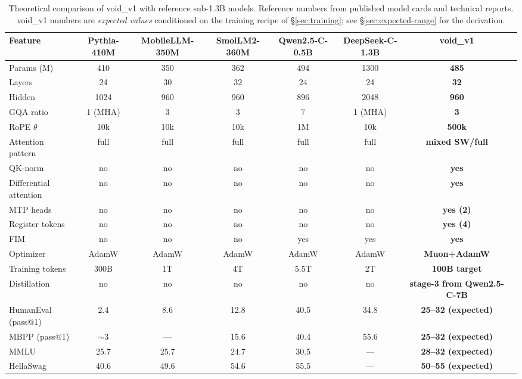 \documentclass[11pt,a4paper]{article}
\theoremstyle{definition}
\theoremstyle{remark}
\begin{document}
\begin{table}[h]
\centering
\scriptsize
\begin{tabular}{lccccccc}
\toprule
\textbf{Feature}
    & \textbf{Pythia-410M}
    & \textbf{MobileLLM-350M}
    & \textbf{SmolLM2-360M}
    & \textbf{Qwen2.5-C-0.5B}
    & \textbf{DeepSeek-C-1.3B}
    & \textbf{void\_v1} \\
\midrule
Params (M)
    & 410 & 350 & 362 & 494 & 1300 & \textbf{485} \\
Layers
    & 24 & 30 & 32 & 24 & 24 & \textbf{32} \\
Hidden
    & 1024 & 960 & 960 & 896 & 2048 & \textbf{960} \\
GQA ratio
    & 1 (MHA) & 3 & 3 & 7 & 1 (MHA) & \textbf{3} \\
RoPE $\theta$
    & 10k & 10k & 10k & 1M & 10k & \textbf{500k} \\
Attention pattern
    & full & full & full & full & full & \textbf{mixed SW/full} \\
QK-norm
    & no & no & no & no & no & \textbf{yes} \\
Differential attention
    & no & no & no & no & no & \textbf{yes} \\
MTP heads
    & no & no & no & no & no & \textbf{yes (2)} \\
Register tokens
    & no & no & no & no & no & \textbf{yes (4)} \\
FIM
    & no & no & no & yes & yes & \textbf{yes} \\
Optimizer
    & AdamW & AdamW & AdamW & AdamW & AdamW & \textbf{Muon+AdamW} \\
Training tokens
    & 300B & 1T & 4T & 5.5T & 2T & \textbf{100B target} \\
Distillation
    & no & no & no & no & no & \textbf{stage-3 from Qwen2.5-C-7B} \\
\midrule
HumanEval (pass@1)
    & 2.4 & 8.6 & 12.8 & 40.5 & 34.8 & \textbf{25--32 (expected)} \\
MBPP (pass@1)
    & $\sim 3$ & --- & 15.6 & 40.4 & 55.6 & \textbf{25--32 (expected)} \\
MMLU
    & 25.7 & 25.7 & 24.7 & 30.5 & --- & \textbf{28--32 (expected)} \\
HellaSwag
    & 40.6 & 49.6 & 54.6 & 55.5 & --- & \textbf{50--55 (expected)} \\
\bottomrule
\end{tabular}
\caption{Theoretical comparison of void\_v1 with reference sub-1.3B
         models. Reference numbers from published model cards and
         technical reports. void\_v1 numbers are \emph{expected values}
         conditioned on the training recipe of \S\ref{sec:training};
         see \S\ref{sec:expected-range} for the derivation.}
\label{tab:compare}
\end{table}
\end{document}

